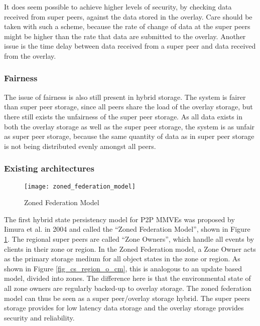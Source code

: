 It does seem possible to achieve higher levels of security, by checking data received from super peers, against the data stored in the overlay. Care should be taken with such a scheme, because the rate of change of data at the super peers might be higher than the rate that data are submitted to the overlay. Another issue is the time delay between data received from a super peer and data received from the overlay.

\subsubsection{Fairness}

The issue of fairness is also still present in hybrid storage. The system is fairer than super peer storage, since all peers share the load of the overlay storage, but there still exists the unfairness of the super peer storage. As all data exists in both the overlay storage as well as the super peer storage, the system is as unfair as super peer storage, because the same quantity of data as in super peer storage is not being distributed evenly amongst all peers.

\subsubsection{Existing architectures}

\begin{figure}[htbp]
 \centering
 \texttt{[image: zoned\_federation\_model]}
 \caption{Zoned Federation Model \cite{zoned_federation}}
 \label{fig_zoned_federation_model}
\end{figure}
%
The first hybrid state persistency model for P2P MMVEs was proposed by Iimura et al. in 2004 \cite{zoned_federation} and called the ``Zoned Federation Model'', shown in Figure \ref{fig_zoned_federation_model}. The regional super peers are called ``Zone Owners'', which handle all events by clients in their zone or region. In the Zoned Federation model, a Zone Owner acts as the primary storage medium for all object states in the zone or region. As shown in Figure \ref{fig_cs_region_o_cm}, this is analogous to an update based model, divided into zones. The difference here is that the environmental state of all zone owners are regularly backed-up to overlay storage. The zoned federation model can thus be seen as a super peer/overlay storage hybrid. The super peers storage provides for low latency data storage and the overlay storage provides security and reliability.

